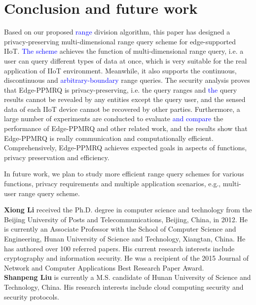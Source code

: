 \documentclass[IEEE JOURNAL OF BIOMEDICAL AND HEALTH INFORMATICS]{IEEEtran}
\begin{document}
{\section{Conclusion and future work}
 Based on our proposed \textcolor{blue}{range} division algorithm, this paper has designed a privacy-preserving multi-dimensional range query scheme for edge-supported IIoT. \textcolor{blue}{The scheme} achieves the function of multi-dimensional range query, i.e. a user can query different types of data at once, which is very suitable for the real application of IIoT environment. Meanwhile, it also supports the continuous, discontinuous and \textcolor{blue}{arbitrary-boundary} range queries. The security analysis proves that Edge-PPMRQ is privacy-preserving, i.e. the query ranges and \textcolor{blue}{the} query results cannot be revealed by any entities except the query user, and the sensed data of each IIoT device cannot be recovered by other parties. Furthermore, a large number of experiments are conducted to evaluate \textcolor{blue}{and compare} the performance of Edge-PPMRQ and other related work, and the results show that Edge-PPMRQ is really communication and computationally efficient. Comprehensively, Edge-PPMRQ achieves expected goals in aspects of functions, privacy preservation and efficiency. 
 
 In future work, we plan to study more efficient range query schemes for various functions, privacy requirements and multiple application scenarios, e.g., multi-user range query scheme.

\footnotesize


\vspace{12 pt}
\normalsize

\iffalse
\noindent\textbf{Xiong Li} received the Ph.D. degree in computer science and technology from the Beijing University of Posts and Telecommunications, Beijing, China, in 2012. He is currently an Associate Professor with the School of Computer Science and Engineering, Hunan University of Science and Technology, Xiangtan, China. He has authored over 100 referred papers. His current research interests include cryptography and information security. He was a recipient of the 2015 Journal of Network and Computer Applications Best Research Paper Award.\\

\noindent\textbf{Shanpeng Liu}
 is currently a M.S. candidate of Hunan University of Science and Technology, China. His research interests include cloud computing security and security protocols.\\

}
\end{document}
